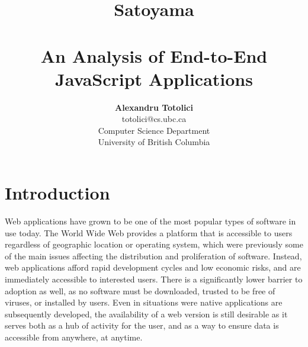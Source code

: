 \documentclass[letterpaper,twocolumn,10pt,draft]{article}
\begin{document}
\date{}

\title{\selectfont
    {\huge{\textbf{Satoyama}}}\\
    {\large{\textbf{\\An Analysis of End-to-End JavaScript Applications}}}}


\author{
{\rm \textbf{Alexandru Totolici}}\\
{\rm totolici@cs.ubc.ca}\\
Computer Science Department\\
University of British Columbia\\
} %

\maketitle

\thispagestyle{empty}

\begin{abstract}
\end{abstract}

\section{\label{sec:intro}Introduction}


Web applications have grown to be one of the most popular types of software in use today. The World Wide Web provides a platform that is accessible to users regardless of geographic location or operating system, which were previously some of the main issues affecting the distribution and proliferation of software. Instead, web applications afford rapid development cycles and low economic risks, and are immediately accessible to interested users. There is a significantly lower barrier to adoption as well, as no software must be downloaded, trusted to be free of viruses, or installed by users. Even in situations were native applications are subsequently developed, the availability of a web version is still desirable as it serves both as a hub of activity for the user, and as a way to ensure data is accessible from anywhere, at anytime.
\end{document}

